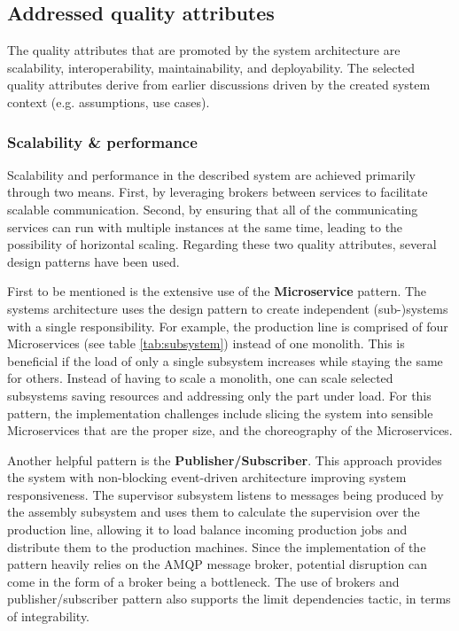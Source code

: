 \documentclass[conference]{IEEEtran}
\begin{document}
\subsection{Addressed quality attributes}
The quality attributes that are promoted by the system architecture are scalability, interoperability, maintainability, and deployability. The selected quality attributes derive from earlier discussions driven by the created system context (e.g. assumptions, use cases).

\subsubsection{Scalability \& performance}
Scalability and performance in the described system are achieved primarily through two means. First, by leveraging brokers between services to facilitate scalable communication. Second, by ensuring that all of the communicating services can run with multiple instances at the same time, leading to the possibility of horizontal scaling. Regarding these two quality attributes, several design patterns have been used.

First to be mentioned is the extensive use of the \textbf{Microservice} pattern. The systems architecture uses the design pattern to create independent (sub-)systems with a single responsibility. For example, the production line is comprised of four Microservices (see table \ref{tab:subsystem}) instead of one monolith. This is beneficial if the load of only a single subsystem increases while staying the same for others. Instead of having to scale a monolith, one can scale selected subsystems saving resources and addressing only the part under load. For this pattern, the implementation challenges include slicing the system into sensible Microservices that are the proper size, and the choreography of the Microservices.

Another helpful pattern is the \textbf{Publisher/Subscriber}. This approach provides the system with non-blocking event-driven architecture improving system responsiveness. The supervisor subsystem listens to messages being produced by the assembly subsystem and uses them to calculate the supervision over the production line, allowing it to load balance incoming production jobs and distribute them to the production machines. Since the implementation of the pattern heavily relies on the AMQP message broker, potential disruption can come in the form of a broker being a bottleneck. The use of brokers and publisher/subscriber pattern also supports the limit dependencies tactic, in terms of integrability.
\end{document}
